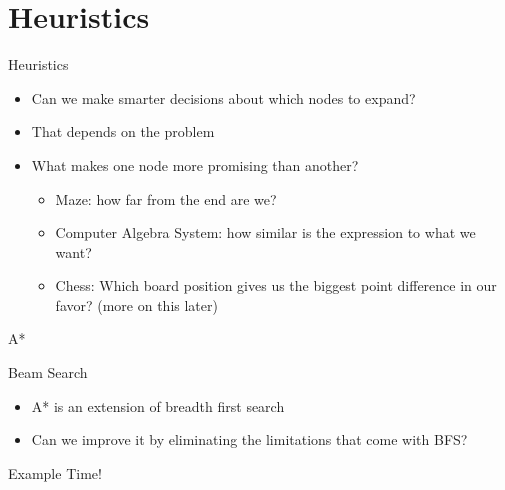 \documentclass[presentation]{beamer}
\begin{document}
\section{Heuristics}
\begin{frame}{Heuristics}
  \begin{itemize}
  \item Can we make smarter 
    decisions about which nodes to
    expand?
  \item That depends on the problem
  \item What makes one node more
    promising than another?
   \begin{itemize}
   \item<2-> Maze: how far from the
     end are we?
   \item<3-> Computer Algebra
     System: how similar is the
     expression to what we want?
   \item<4-> Chess: Which board
     position gives us the biggest
     point difference in our favor?
     (more on this later)
   \end{itemize}
  \end{itemize}
\end{frame}
\begin{frame}{A*}
\end{frame}
\begin{frame}{Beam Search}
  \begin{itemize}
  \item A* is an extension of breadth first search
  \item Can we improve it by eliminating the limitations that come
    with BFS?
  \end{itemize}
\end{frame}
\begin{frame}{Example Time!}
\end{frame}
\end{document}
